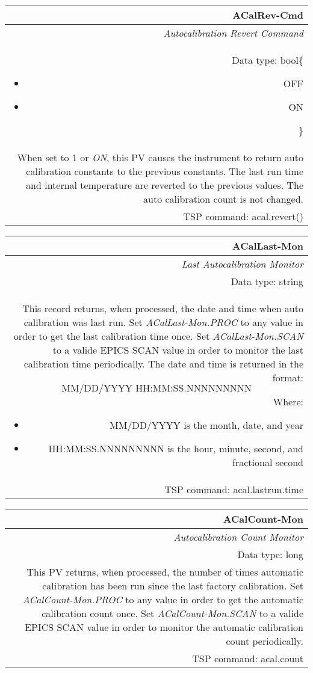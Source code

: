 \documentclass[openany]{article}
\begin{document}
		\begin{tabular}{N}
			\hline
			\bfseries ACalRev-Cmd\label{pv:acalrev-cmd} \\ \hline
			\emph{Autocalibration Revert Command} \\
			Data type: bool\{\begin{itemize}[noitemsep]
				\small
				\item[] OFF
				\item[] ON
			\end{itemize}\} \\
			When set to 1 or \emph{ON}, this PV causes the instrument to return auto calibration constants to the previous constants. The last run time and internal temperature are reverted to the previous values. The auto calibration
count is not changed. \\
			TSP command: acal.revert()
		\end{tabular}

		\begin{tabular}{N}
			\hline
			\bfseries ACalLast-Mon\label{pv:acallast-mon} \\ \hline
			\emph{Last Autocalibration Monitor} \\
			Data type: string \\
			This record returns, when processed, the date and time when auto calibration was last run. Set \emph{ACalLast-Mon.PROC} to any value in order to get the last calibration time once. Set \emph{ACalLast-Mon.SCAN} to a valide EPICS SCAN value in order to monitor the last calibration time periodically. The date and time is returned in the format: $$ \text{MM/DD/YYYY HH:MM:SS.NNNNNNNNN} $$ Where: \begin{itemize} \item MM/DD/YYYY is the month, date, and year \item HH:MM:SS.NNNNNNNNN is the hour, minute, second, and fractional second \end{itemize} \\
			TSP command: acal.lastrun.time
		\end{tabular}

		\begin{tabular}{N}
			\hline
			\bfseries ACalCount-Mon\label{pv:acalcount-mon} \\ \hline
			\emph{Autocalibration Count Monitor} \\
			Data type: long \\
			This PV returns, when processed, the number of times automatic calibration has been run since the last factory calibration. Set \emph{ACalCount-Mon.PROC} to any value in order to get the automatic calibration count once. Set \emph{ACalCount-Mon.SCAN} to a valide EPICS SCAN value in order to monitor the automatic calibration count periodically. \\
			TSP command: acal.count
		\end{tabular}
\end{document}
